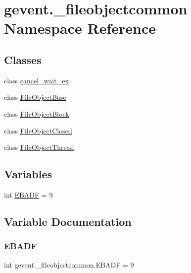 \hypertarget{namespacegevent_1_1__fileobjectcommon}{}\section{gevent.\+\_\+fileobjectcommon Namespace Reference}
\label{namespacegevent_1_1__fileobjectcommon}
\subsection*{Classes}
\begin{DoxyCompactItemize}
\item 
class \hyperlink{classgevent_1_1__fileobjectcommon_1_1cancel__wait__ex}{cancel\+\_\+wait\+\_\+ex}
\item 
class \hyperlink{classgevent_1_1__fileobjectcommon_1_1_file_object_base}{File\+Object\+Base}
\item 
class \hyperlink{classgevent_1_1__fileobjectcommon_1_1_file_object_block}{File\+Object\+Block}
\item 
class \hyperlink{classgevent_1_1__fileobjectcommon_1_1_file_object_closed}{File\+Object\+Closed}
\item 
class \hyperlink{classgevent_1_1__fileobjectcommon_1_1_file_object_thread}{File\+Object\+Thread}
\end{DoxyCompactItemize}
\subsection*{Variables}
\begin{DoxyCompactItemize}
\item 
int \hyperlink{namespacegevent_1_1__fileobjectcommon_a63175a3eb82ee46ec27f2c8cb0f1deaf}{E\+B\+A\+DF} = 9
\end{DoxyCompactItemize}


\subsection{Variable Documentation}
\mbox{\label{namespacegevent_1_1__fileobjectcommon_a63175a3eb82ee46ec27f2c8cb0f1deaf}} 
\subsubsection{\texorpdfstring{E\+B\+A\+DF}{EBADF}}
{\footnotesize\ttfamily int gevent.\+\_\+fileobjectcommon.\+E\+B\+A\+DF = 9}

